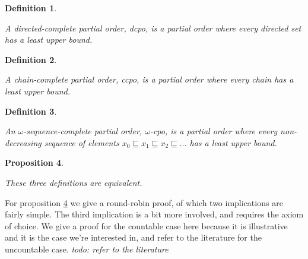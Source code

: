 \documentclass[a4paper]{article}
\newcommand{\below}{\sqsubseteq}
\newcommand{\todo}[1]{\smallskip \noindent \emph{todo: #1} \smallskip}
\newtheorem{definition}{Definition}[section]
\newtheorem{proposition}[definition]{Proposition}
\begin{document}
\begin{definition} \label{defCpoDirectedComplete}

A directed-complete partial order, \emph{dcpo}, is a partial order where every
directed set has a least upper bound.

\end{definition}


\begin{definition} \label{defCpoChainComplete}

A chain-complete partial order, \emph{ccpo}, is a partial order where every chain
has a least upper bound.

\end{definition}


\begin{definition} \label{defCpoOmegaSequenceComplete}

An $\omega$-sequence-complete partial order, \emph{$\omega$-cpo}, is a partial
order where every non-decreasing sequence of elements $x_0 \below x_1 \below x_2
\below \ldots $ has a least upper bound.

\end{definition}


\begin{proposition} \label{propDefinitionsAreEquivalent}

These three definitions are equivalent.

\end{proposition}

For proposition \ref{propDefinitionsAreEquivalent} we give a round-robin proof,
of which two implications are fairly simple. The third implication is a bit more
involved, and requires the axiom of choice. We give a proof for the countable
case here because it is illustrative and it is the case we're interested in, and
refer to the literature for the uncountable case. \todo{refer to the literature}
\end{document}
